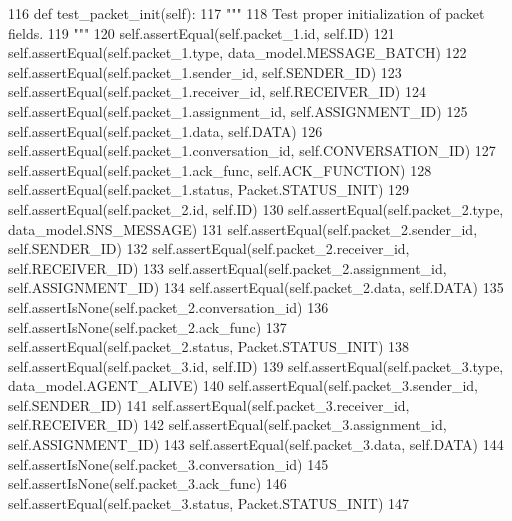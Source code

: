 \begin{DoxyCode}
116     \textcolor{keyword}{def }test\_packet\_init(self):
117         \textcolor{stringliteral}{"""}
118 \textcolor{stringliteral}{        Test proper initialization of packet fields.}
119 \textcolor{stringliteral}{        """}
120         self.assertEqual(self.packet\_1.id, self.ID)
121         self.assertEqual(self.packet\_1.type, data\_model.MESSAGE\_BATCH)
122         self.assertEqual(self.packet\_1.sender\_id, self.SENDER\_ID)
123         self.assertEqual(self.packet\_1.receiver\_id, self.RECEIVER\_ID)
124         self.assertEqual(self.packet\_1.assignment\_id, self.ASSIGNMENT\_ID)
125         self.assertEqual(self.packet\_1.data, self.DATA)
126         self.assertEqual(self.packet\_1.conversation\_id, self.CONVERSATION\_ID)
127         self.assertEqual(self.packet\_1.ack\_func, self.ACK\_FUNCTION)
128         self.assertEqual(self.packet\_1.status, Packet.STATUS\_INIT)
129         self.assertEqual(self.packet\_2.id, self.ID)
130         self.assertEqual(self.packet\_2.type, data\_model.SNS\_MESSAGE)
131         self.assertEqual(self.packet\_2.sender\_id, self.SENDER\_ID)
132         self.assertEqual(self.packet\_2.receiver\_id, self.RECEIVER\_ID)
133         self.assertEqual(self.packet\_2.assignment\_id, self.ASSIGNMENT\_ID)
134         self.assertEqual(self.packet\_2.data, self.DATA)
135         self.assertIsNone(self.packet\_2.conversation\_id)
136         self.assertIsNone(self.packet\_2.ack\_func)
137         self.assertEqual(self.packet\_2.status, Packet.STATUS\_INIT)
138         self.assertEqual(self.packet\_3.id, self.ID)
139         self.assertEqual(self.packet\_3.type, data\_model.AGENT\_ALIVE)
140         self.assertEqual(self.packet\_3.sender\_id, self.SENDER\_ID)
141         self.assertEqual(self.packet\_3.receiver\_id, self.RECEIVER\_ID)
142         self.assertEqual(self.packet\_3.assignment\_id, self.ASSIGNMENT\_ID)
143         self.assertEqual(self.packet\_3.data, self.DATA)
144         self.assertIsNone(self.packet\_3.conversation\_id)
145         self.assertIsNone(self.packet\_3.ack\_func)
146         self.assertEqual(self.packet\_3.status, Packet.STATUS\_INIT)
147 
\end{DoxyCode}
\mbox{\label{classparlai_1_1mturk_1_1core_1_1dev_1_1test_1_1test__socket__manager_1_1TestPacket_a7f98487bdd6d93492e863e0dde224508}} 
